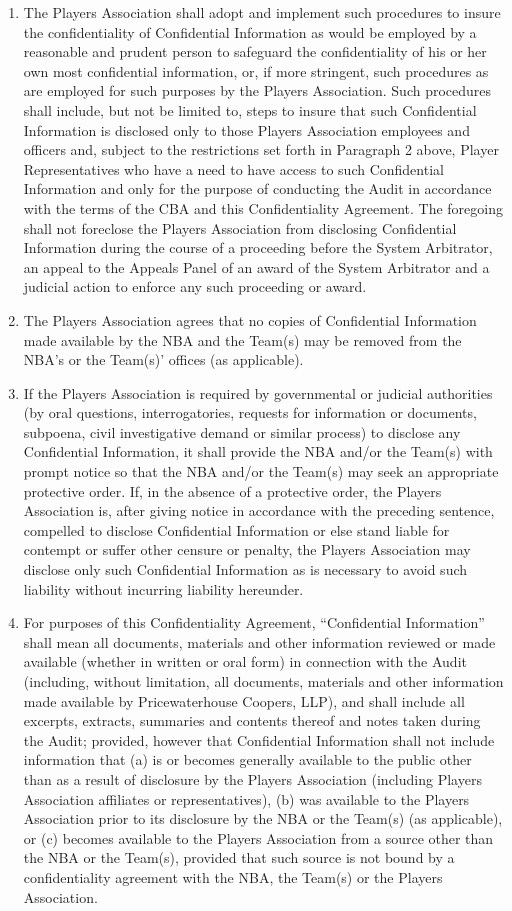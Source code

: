 \documentclass[
]{book}
\begin{document}
\begin{enumerate}
\item
  The Players Association shall adopt and implement such procedures to insure the confidentiality of Confidential Information as would be employed by a reasonable and prudent person to safeguard the confidentiality of his or her own most confidential information, or, if more stringent, such procedures as are employed for such purposes by the Players Association. Such procedures shall include, but not be limited to, steps to insure that such Confidential Information is disclosed only to those Players Association employees and officers and, subject to the restrictions set forth in Paragraph 2 above, Player Representatives who have a need to have access to such Confidential Information and only for the purpose of conducting the Audit in accordance with the terms of the CBA and this Confidentiality Agreement. The foregoing shall not foreclose the Players Association from disclosing Confidential Information during the course of a proceeding before the System Arbitrator, an appeal to the Appeals Panel of an award of the System Arbitrator and a judicial action to enforce any such proceeding or award.
\item
  The Players Association agrees that no copies of Confidential Information made available by the NBA and the Team(s) may be removed from the NBA's or the Team(s)' offices (as applicable).
\item
  If the Players Association is required by governmental or judicial authorities (by oral questions, interrogatories, requests for information or documents, subpoena, civil investigative demand or similar process) to disclose any Confidential Information, it shall provide the NBA and/or the Team(s) with prompt notice so that the NBA and/or the Team(s) may seek an appropriate protective order. If, in the absence of a protective order, the Players Association is, after giving notice in accordance with the preceding sentence, compelled to disclose Confidential Information or else stand liable for contempt or suffer other censure or penalty, the Players Association may disclose only such Confidential Information as is necessary to avoid such liability without incurring liability hereunder.
\item
  For purposes of this Confidentiality Agreement, ``Confidential Information'' shall mean all documents, materials and other information reviewed or made available (whether in written or oral form) in connection with the Audit (including, without limitation, all documents, materials and other information made available by Pricewaterhouse Coopers, LLP), and shall include all excerpts, extracts, summaries and contents thereof and notes taken during the Audit; provided, however that Confidential Information shall not include information that (a) is or becomes generally available to the public other than as a result of disclosure by the Players Association (including Players Association affiliates or representatives), (b) was available to the Players Association prior to its disclosure by the NBA or the Team(s) (as applicable), or (c) becomes available to the Players Association from a source other than the NBA or the Team(s), provided that such source is not bound by a confidentiality agreement with the NBA, the Team(s) or the Players Association.

\end{enumerate}
\end{document}
